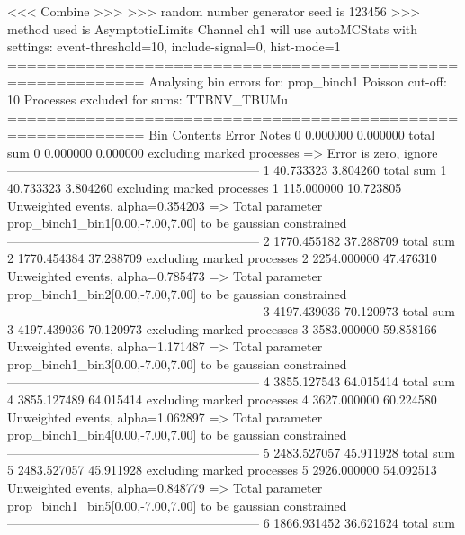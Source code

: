  <<< Combine >>> 
>>> random number generator seed is 123456
>>> method used is AsymptoticLimits
Channel ch1 will use autoMCStats with settings: event-threshold=10, include-signal=0, hist-mode=1
============================================================
Analysing bin errors for: prop_binch1
Poisson cut-off: 10
Processes excluded for sums: TTBNV_TBUMu
============================================================
Bin        Contents        Error           Notes                         
0          0.000000        0.000000        total sum                     
0          0.000000        0.000000        excluding marked processes    
  => Error is zero, ignore      
------------------------------------------------------------
1          40.733323       3.804260        total sum                     
1          40.733323       3.804260        excluding marked processes    
1          115.000000      10.723805       Unweighted events, alpha=0.354203
  => Total parameter prop_binch1_bin1[0.00,-7.00,7.00] to be gaussian constrained
------------------------------------------------------------
2          1770.455182     37.288709       total sum                     
2          1770.454384     37.288709       excluding marked processes    
2          2254.000000     47.476310       Unweighted events, alpha=0.785473
  => Total parameter prop_binch1_bin2[0.00,-7.00,7.00] to be gaussian constrained
------------------------------------------------------------
3          4197.439036     70.120973       total sum                     
3          4197.439036     70.120973       excluding marked processes    
3          3583.000000     59.858166       Unweighted events, alpha=1.171487
  => Total parameter prop_binch1_bin3[0.00,-7.00,7.00] to be gaussian constrained
------------------------------------------------------------
4          3855.127543     64.015414       total sum                     
4          3855.127489     64.015414       excluding marked processes    
4          3627.000000     60.224580       Unweighted events, alpha=1.062897
  => Total parameter prop_binch1_bin4[0.00,-7.00,7.00] to be gaussian constrained
------------------------------------------------------------
5          2483.527057     45.911928       total sum                     
5          2483.527057     45.911928       excluding marked processes    
5          2926.000000     54.092513       Unweighted events, alpha=0.848779
  => Total parameter prop_binch1_bin5[0.00,-7.00,7.00] to be gaussian constrained
------------------------------------------------------------
6          1866.931452     36.621624       total sum                     
